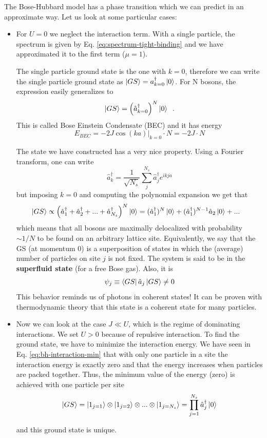 The Bose-Hubbard model has a phase transition which we can predict in an approximate way. Let us look at some particular cases:
\begin{itemize}

    \item For $U=0$ we neglect the interaction term. With a single particle, the spectrum is given by Eq. \ref{eq:spectrum-tight-binding} and we have approximated it to the first term ($\mu=1$).

    \begin{center}
        \scalebox{1}{  }
    \end{center}
    
    The single particle ground state is the one with $k=0$, therefore we can write the single particle ground state as $\ket{GS}=a^\dag_{k=0}\ket{0}$. For N bosons, the expression easily generalizes to
    $$\ket{GS} = \left(\hat{a}^\dag_{k=0}\right)^{N}\ket{0} \;\;.$$ %
    This is called Bose Einstein Condensate (BEC) and it has energy
    $$E_{BEC} = -2J \cos(ka)\big|_{k=0}\cdot N = -2J\cdot N$$

    The state we have constructed has a very nice property. Using a Fourier transform, one can write
    $$\hat{a}^\dag_k = \frac{1}{\sqrt{N_s}}\sum_j^{N_s} \hat{a}^\dag_j e^{ikja}$$
    but imposing $k=0$ and computing the polynomial expansion we get that
    \begin{align*}
        \ket{GS} &\propto
            \left( \hat{a}_1^\dag + \hat{a}_2^\dag  + ... + \hat{a}_{N_s}^\dag\right)^N \ket{0}
        = (\hat{a}_1^\dag)^N\ket{0} + (\hat{a}_1^\dag)^{N-1}\hat{a}_2\ket{0} + ...
    \end{align*}
    which means that all bosons are maximally delocalized with probability $\sim 1/N$ to be found on an arbitrary lattice site. Equivalently, we say that the GS (at momentum 0) is a superposition of states in which the (average) number of particles on site $j$ is not fixed. The system is said to be in the \textbf{superfluid state} (for a free Bose gas). Also, it is
    $$\psi_j \equiv \bra{GS}\hat{a}_j\ket{GS}  \neq 0$$
    This behavior reminds us of photons in coherent states!
    It can be proven with thermodynamic theory that this state is a coherent state for many particles.
    
    \item Now we can look at the case $J\ll U$, which is the regime of dominating interactions. We set $U>0$ because of repulsive interaction. To find the ground state, we have to minimize the interaction energy. We have seen in Eq. \ref{eq:bh-interaction-min} that with only one particle in a site the interaction energy is exactly zero and that the energy increases when particles are packed together. Thus, the minimum value of the energy (zero) is achieved with one particle per site
    $$\ket{GS} = \ket{1_{j=1}}\otimes\ket{1_{j=2}}\otimes...\otimes\ket{1_{j=N_s}} = \prod_{j=1}^{N_s}\hat{a}_j^\dag\ket{0}$$
    \begin{center}
        \scalebox{1.2}{
            
        }
    \end{center}
    and this ground state is unique.


\end{itemize}
